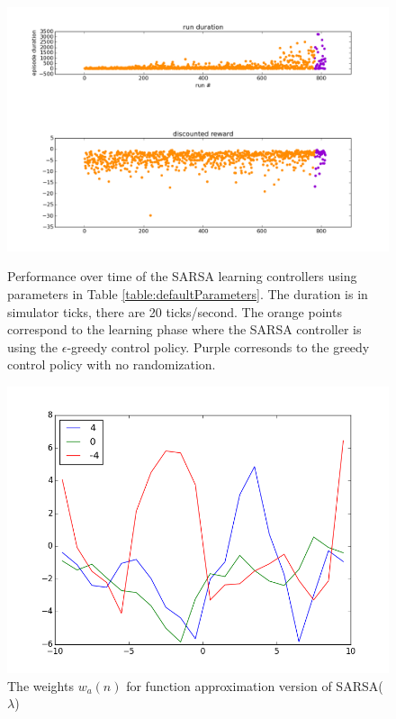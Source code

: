 \documentclass{article}
\begin{document}
\begin{figure}
\centering
\includegraphics[scale=0.5]{figures/sarsaDiscrete_lam_0_7_6500_time_series_learned_controllers.png}
\label{figures/sarsaDiscrete_lam_0_7_6500_time_series_learned_controllers.png}
\caption{Performance over time of the SARSA learning controllers using parameters in Table \ref{table:defaultParameters}. The duration is in simulator ticks, there are 20 ticks/second. The orange points correspond to the learning phase where the SARSA controller is using the $\epsilon$-greedy control policy. Purple corresonds to the greedy control policy with no randomization.}
\end{figure}


\begin{figure}
\centering
\includegraphics[scale=0.5]{figures/sarsa_cts_weights.png}
\caption{The weights $w_a(n)$ for function approximation version of SARSA($\lambda$)}
\label{figures/sarsa_cts_weights.png}
\end{figure}
\end{document}

